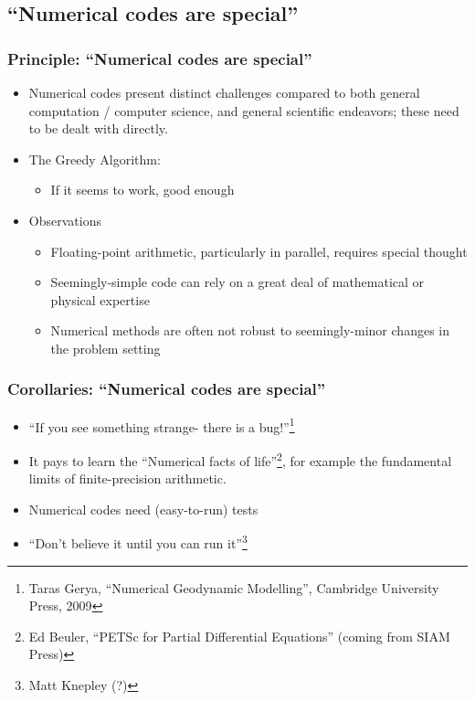 \documentclass{beamer}
\begin{document}
\subsection{``Numerical codes are special''}
\begin{frame}[fragile]
\frametitle{Principle: ``Numerical codes are special''}
\begin{itemize}
  \item Numerical codes present distinct challenges compared to both general computation / computer science, and general scientific endeavors; these need to be dealt with directly.
\item The Greedy Algorithm:
\begin{itemize}
\item If it seems to work, good enough
\end{itemize}
\item Observations
\begin{itemize}
\item Floating-point arithmetic, particularly in parallel, requires special thought
\item Seemingly-simple code can rely on a great deal of mathematical or physical expertise
\item Numerical methods are often not robust to seemingly-minor changes in the problem setting
\end{itemize}
\end{itemize}
\end{frame}

\begin{frame}[fragile]
\frametitle{Corollaries: ``Numerical codes are special''}
\begin{itemize}
  \item ``If you see something strange- there is a bug!''\footnote{Taras Gerya, ``Numerical Geodynamic Modelling'', Cambridge University Press, 2009}
  \item It pays to learn the ``Numerical facts of life''\footnote{Ed Beuler, ``PETSc for Partial Differential Equations'' (coming from SIAM Press)}, for example the fundamental limits of finite-precision arithmetic.
  \item Numerical codes need (easy-to-run) tests
  \item ``Don't believe it until you can run it''\footnote{Matt Knepley (?)}
\end{itemize}
\end{frame}
\end{document}
